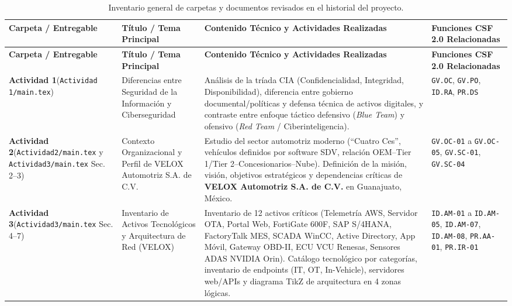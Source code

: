 \documentclass[letterpaper,11pt]{article}
\begin{document}
\begin{longtable}{|L{2.8cm}|L{3.5cm}|L{6.2cm}|C{3.8cm}|}
\caption{Inventario general de carpetas y documentos revisados en el historial del proyecto.}
\label{tab:inventario-proyecto} \\
\hline
{}
\textbf{Carpeta / Entregable} & \textbf{Título / Tema Principal} & \textbf{Contenido Técnico y Actividades Realizadas} & \textbf{Funciones CSF 2.0 Relacionadas} \\
\hline
\endfirsthead
\hline
{}
\textbf{Carpeta / Entregable} & \textbf{Título / Tema Principal} & \textbf{Contenido Técnico y Actividades Realizadas} & \textbf{Funciones CSF 2.0 Relacionadas} \\
\hline
\endhead
\hline
\endfoot

\textbf{Actividad 1}\newline (\texttt{Actividad 1/main.tex}) &
Diferencias entre Seguridad de la Información y Ciberseguridad &
Análisis de la tríada CIA (Confidencialidad, Integridad, Disponibilidad), diferencia entre gobierno documental/políticas y defensa técnica de activos digitales, y contraste entre enfoque táctico defensivo (\textit{Blue Team}) y ofensivo (\textit{Red Team} / Ciberinteligencia). &
\texttt{GV.OC}, \texttt{GV.PO}, \texttt{ID.RA}, \texttt{PR.DS} \\
\hline

\textbf{Actividad 2}\newline (\texttt{Actividad2/main.tex} y \texttt{Actividad3/main.tex} Sec. 2--3) &
Contexto Organizacional y Perfil de VELOX Automotriz S.A. de C.V. &
Estudio del sector automotriz moderno (``Cuatro Ces'', vehículos definidos por software SDV, relación OEM--Tier 1/Tier 2--Concesionarios--Nube). Definición de la misión, visión, objetivos estratégicos y dependencias críticas de \textbf{VELOX Automotriz S.A. de C.V.} en Guanajuato, México. &
\texttt{GV.OC-01} a \texttt{GV.OC-05}, \texttt{GV.SC-01}, \texttt{GV.SC-04} \\
\hline

\textbf{Actividad 3}\newline (\texttt{Actividad3/main.tex} Sec. 4--7) &
Inventario de Activos Tecnológicos y Arquitectura de Red (VELOX) &
Inventario de 12 activos críticos (Telemetría AWS, Servidor OTA, Portal Web, FortiGate 600F, SAP S/4HANA, FactoryTalk MES, SCADA WinCC, Active Directory, App Móvil, Gateway OBD-II, ECU VCU Renesas, Sensores ADAS NVIDIA Orin). Catálogo tecnológico por categorías, inventario de endpoints (IT, OT, In-Vehicle), servidores web/APIs y diagrama TikZ de arquitectura en 4 zonas lógicas. &
\texttt{ID.AM-01} a \texttt{ID.AM-05}, \texttt{ID.AM-07}, \texttt{ID.AM-08}, \texttt{PR.AA-01}, \texttt{PR.IR-01} \\
\hline


\end{longtable}
\end{document}

